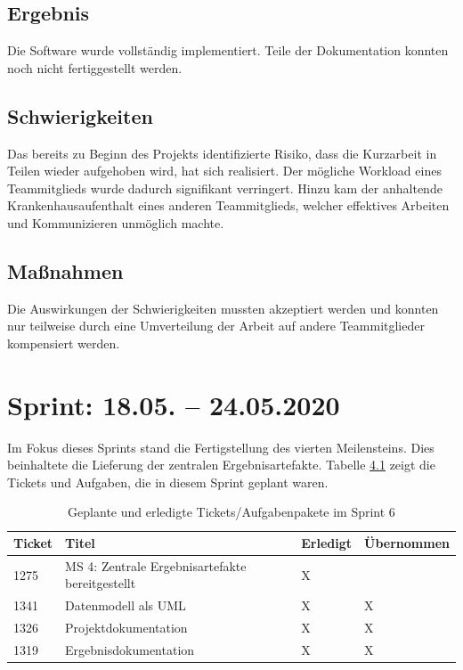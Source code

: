 \documentclass[a4paper,11pt,listof=numbered,glossary=totoc,parskip=half,toc=bib]{scrreprt}
\begin{document}
    \section{Ergebnis}
	Die Software wurde vollständig implementiert. Teile der Dokumentation konnten noch nicht fertiggestellt werden.   
    
    \section{Schwierigkeiten}
    Das bereits zu Beginn des Projekts identifizierte Risiko, dass die Kurzarbeit in Teilen wieder aufgehoben wird, hat sich realisiert. Der mögliche Workload eines Teammitglieds wurde dadurch signifikant verringert. Hinzu kam der anhaltende Krankenhausaufenthalt eines anderen Teammitglieds, welcher effektives Arbeiten und Kommunizieren unmöglich machte.
    
    \section{Maßnahmen}
    Die Auswirkungen der Schwierigkeiten mussten akzeptiert werden und konnten nur teilweise durch eine Umverteilung der Arbeit auf andere Teammitglieder kompensiert werden.
    
    \chapter{Sprint: 18.05. – 24.05.2020}
    
    Im Fokus dieses Sprints stand die Fertigstellung des vierten Meilensteins. Dies beinhaltete die Lieferung der zentralen Ergebnisartefakte. Tabelle \ref{tab:sprint6} zeigt die Tickets und Aufgaben, die in diesem Sprint geplant waren.
    
\begin{table}    
    \begin{tabularx}{\textwidth}{lXll}
			\toprule
			\textbf{Ticket} & \textbf{Titel} & \textbf{Erledigt} & \textbf{Übernommen} \\
			\midrule
1275	&	MS 4: Zentrale Ergebnisartefakte bereitgestellt	&	X	&		\\
1341	&	Datenmodell als UML	&	X	&	X	\\
1326	&	Projektdokumentation	&	X	&	X	\\
1319	&	Ergebnisdokumentation	&	X	&	X	\\

			\bottomrule
		\end{tabularx}
\caption{Geplante und erledigte Tickets/Aufgabenpakete im Sprint 6}
\label{tab:sprint6}
\end{table}
    
\end{document}
